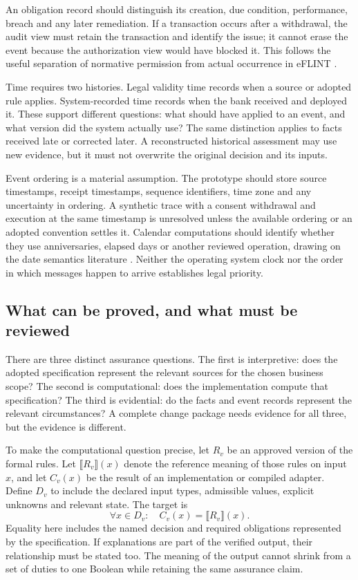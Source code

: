 An obligation record should distinguish its creation, due condition, performance,
breach and any later remediation. If a transaction occurs after a withdrawal, the
audit view must retain the transaction and identify the issue; it cannot erase
the event because the authorization view would have blocked it. This follows the
useful separation of normative permission from actual occurrence in eFLINT
\citep{eflint2026}.

Time requires two histories. Legal validity time records when a source or adopted
rule applies. System-recorded time records when the bank received and deployed
it. These support different questions: what should have applied to an event, and
what version did the system actually use? The same distinction applies to facts
received late or corrected later. A reconstructed historical assessment may use
new evidence, but it must not overwrite the original decision and its inputs.

Event ordering is a material assumption. The prototype should store source
timestamps, receipt timestamps, sequence identifiers, time zone and any uncertainty
in ordering. A synthetic trace with a consent withdrawal and execution at the
same timestamp is unresolved unless the available ordering or an adopted
convention settles it. Calendar computations should identify whether they use
anniversaries, elapsed days or another reviewed operation, drawing on the date
semantics literature \citep{dates2024}. Neither the operating system clock nor the
order in which messages happen to arrive establishes legal priority.

\subsection{What can be proved, and what must be reviewed}
\label{sec:proof}

There are three distinct assurance questions. The first is interpretive: does the
adopted specification represent the relevant sources for the chosen business
scope? The second is computational: does the implementation compute that
specification? The third is evidential: do the facts and event records represent
the relevant circumstances? A complete change package needs evidence for all
three, but the evidence is different.

To make the computational question precise, let $R_v$ be an approved version of
the formal rules. Let $\llbracket R_v\rrbracket(x)$ denote the reference meaning
of those rules on input $x$, and let $C_v(x)$ be the result of an implementation
or compiled adapter. Define $D_v$ to include the declared input types, admissible
values, explicit unknowns and relevant state. The target is
\begin{equation}
 \forall x\in D_v:\quad C_v(x)=\llbracket R_v\rrbracket(x).
 \label{eq:refinement}
\end{equation}
Equality here includes the named decision and required obligations represented by
the specification. If explanations are part of the verified output, their
relationship must be stated too. The meaning of the output cannot shrink from a
set of duties to one Boolean while retaining the same assurance claim.

